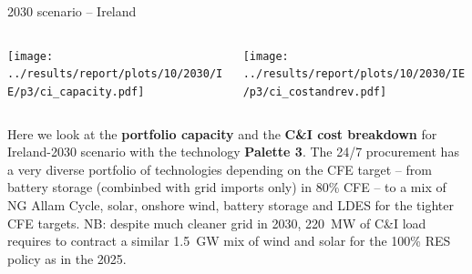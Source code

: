 \begin{frame}{2030 scenario -- Ireland}

  {\footnotesize

  \begin{columns}
  \begin{column}{7cm}
  \centering
  \texttt{[image: ../results/report/plots/10/2030/IE/p3/ci\_capacity.pdf]}
  \end{column}

  \begin{column}{8cm}
  \centering
  \texttt{[image: ../results/report/plots/10/2030/IE/p3/ci\_costandrev.pdf]}
  \end{column}

  \end{columns}

  \begin{columns}
  \begin{column}{15cm}
  Here we look at the {\bf portfolio capacity} 
  and the {\bf C\&I cost breakdown} for Ireland-2030 scenario with 
  the technology {\bf Palette 3}. The 24/7 procurement has a very \alert{diverse portfolio of technologies 
  depending on the CFE target} -- from battery storage 
  (combinbed with grid imports only) in 80\% CFE --
  to a mix of  NG Allam Cycle, solar, onshore wind, battery storage 
  and LDES for the tighter CFE targets.  NB: despite much cleaner grid in 2030,
  220~MW of C\&I load requires to contract a similar 1.5~GW mix of wind 
  and solar for the 100\% RES policy as in the 2025.

  \end{column}
  \end{columns}
  }

\end{frame}



